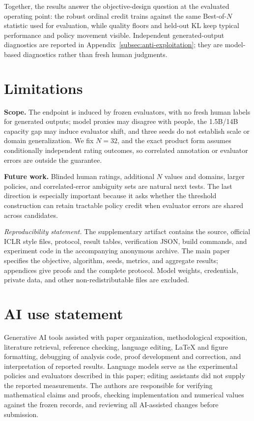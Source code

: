 \documentclass{article}
\theoremstyle{definition}
\theoremstyle{remark}
\begin{document}
Together, the results answer the objective-design question at the evaluated
operating point: the robust ordinal credit trains against the same
Best-of-\(N\) statistic used for evaluation, while quality floors and held-out
KL keep typical performance and policy movement visible.  Independent
generated-output diagnostics are reported in
Appendix~\ref{subsec:anti-exploitation}; they are model-based diagnostics
rather than fresh human judgments.

\section{Limitations}
\label{sec:limitations}
\textbf{Scope.} The endpoint is induced by frozen evaluators, with no fresh human
labels for generated outputs; model proxies may disagree with people, the
1.5B/14B capacity gap may induce evaluator shift, and three seeds do not
establish scale or domain generalization.  We fix \(N=32\), and the exact
product form assumes conditionally independent rating outcomes, so correlated
annotation or evaluator errors are outside the guarantee.

\textbf{Future work.} Blinded human ratings, additional \(N\) values and
domains, larger policies, and correlated-error ambiguity sets are natural next
tests.  The last direction is especially important because it asks whether the
threshold construction can retain tractable policy credit when evaluator errors
are shared across candidates.

\label{main-text-end}

\emph{Reproducibility statement.} The supplementary artifact contains the
source, official ICLR style files, protocol, result tables, verification JSON,
build commands, and experiment code in the accompanying anonymous archive.  The main paper specifies
the objective, algorithm, seeds, metrics, and aggregate results; appendices
give proofs and the complete protocol.  Model weights, credentials, private
data, and other non-redistributable files are excluded.

\section*{AI use statement}
Generative AI tools assisted with paper
organization, methodological exposition, literature retrieval, reference
checking, language editing, LaTeX and figure formatting, debugging of analysis
code, proof development and correction, and interpretation of reported results.  Language models serve as the experimental policies and evaluators described
in this paper; editing assistants did not supply the reported measurements. The authors are responsible for
verifying mathematical claims and proofs, checking implementation and numerical
values against the frozen records, and reviewing all AI-assisted changes
before submission.
\end{document}
